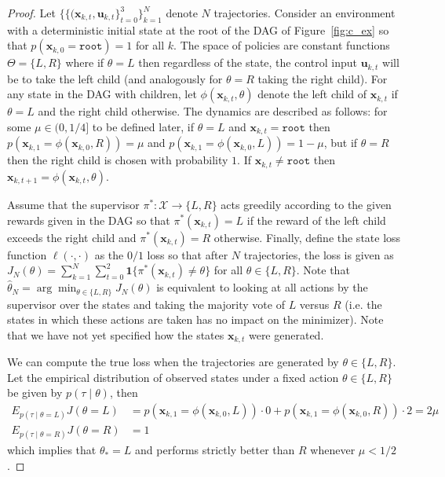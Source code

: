 \documentclass[10pt, conference]{ieeeconf}      %
\newcommand{\bu}{\mathbf{u}}
\newcommand{\bx}{\mathbf{x}}
\begin{document}
\begin{proof}
Let $\{ \{ (\bx_{k,t},\bu_{k,t} \}_{t=0}^3 \}_{k=1}^N$ denote $N$ trajectories.
Consider an environment with a deterministic initial state at the root of the DAG of Figure~\ref{fig:c_ex} so that $p(\bx_{k,0} = \texttt{root}) = 1$ for all $k$. 
The space of policies are constant functions $\Theta = \{L,R\}$ where if $\theta=L$ then regardless of the state, the control input $\bu_{k,t}$ will be to take the left child (and analogously for $\theta=R$ taking the right child).
For any state in the DAG with children, let $\phi(\bx_{k,t},\theta)$ denote the left child of $\bx_{k,t}$ if $\theta=L$ and the right child otherwise. 
The dynamics are described as follows: for some $\mu \in (0,1/4]$ to be defined later, if $\theta=L$ and $\bx_{k,t}=\texttt{root}$ then $p(\bx_{k,1}=\phi(\bx_{k,0},R))=\mu$ and $p(\bx_{k,1}=\phi(\bx_{k,0},L))=1-\mu$, but if $\theta=R$ then the right child is chosen with probability $1$. If $\bx_{k,t} \neq \texttt{root}$ then $\bx_{k,t+1} = \phi(\bx_{k,t},\theta)$.

Assume that the supervisor $\pi^*: \mathcal{X} \rightarrow \{L,R\}$ acts greedily according to the given rewards given in the DAG so that $\pi^*(\bx_{k,t})=L$ if the reward of the left child exceeds the right child and $\pi^*(\bx_{k,t})=R$ otherwise.
Finally, define the state loss function $\ell(\cdot,\cdot)$ as the $0/1$ loss so that after $N$ trajectories, the loss is given as $J_N(\theta)=\sum_{k=1}^N \sum_{t=0}^2 \mathbf{1}\{ \pi^*(\bx_{k,t}) \neq \theta \}$ for all $\theta \in \{L,R\}$. Note that $\widehat{\theta}_N = \arg\min_{\theta \in \{L,R\}} J_N(\theta)$ is equivalent to looking at all actions by the supervisor over the states and taking the majority vote of $L$ versus $R$ (i.e. the states in which these actions are taken has no impact on the minimizer). Note that we have not yet specified how the states $\bx_{k,t}$ were generated. 

We can compute the true loss when the trajectories are generated by $\theta \in \{L,R\}$. Let the empirical distribution of observed states under a fixed action $\theta \in \{L,R\}$ be given by $p(\tau \mid \theta)$, then
\begin{align*}
 E_{p(\tau \mid \theta=L) } J(\theta=L) &= p( \bx_{k,1} = \phi(\bx_{k,0},L) ) \cdot 0 + p( \bx_{k,1} = \phi(\bx_{k,0},R) ) \cdot 2  = 2 \mu\\
   E_{p(\tau \mid \theta=R) } J(\theta=R) &= 1
\end{align*}
which implies that $\theta_* = L$ and performs strictly better than $R$ whenever $\mu < 1/2$.


\end{proof}
\end{document}
